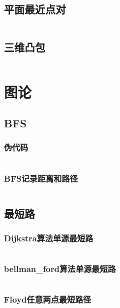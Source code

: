 \documentclass[a4paper,11pt]{article}
\begin{document}
\subsection{平面最近点对}
\inputminted[breaklines,linenos,frame=leftline]{c++}{geometry/dis.cpp}

\subsection{三维凸包}
\inputminted[breaklines,linenos,frame=leftline]{c++}{geometry/hull.cpp}

\newpage
\section{图论} %

\subsection{BFS}
\subsubsection{伪代码}
\inputminted[breaklines,linenos,frame=leftline]{c++}{graph/bfs1.cpp}
\subsubsection{BFS记录距离和路径}
\inputminted[breaklines,linenos,frame=leftline]{c++}{graph/bfs2.cpp}

\subsection{最短路}
\subsubsection{Dijkstra算法单源最短路}
\inputminted[breaklines,linenos,frame=leftline]{c++}{graph/shortest1.cpp}
\subsubsection{bellman\_ford算法单源最短路}
\inputminted[breaklines,linenos,frame=leftline]{c++}{graph/shortest2.cpp}
\subsubsection{Floyd任意两点最短路径}
\inputminted[breaklines,linenos,frame=leftline]{c++}{graph/shortest3.cpp}
\end{document}
